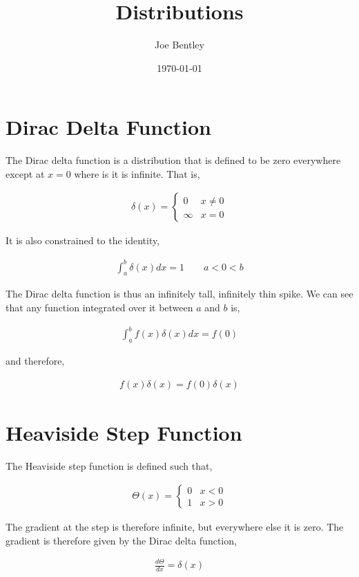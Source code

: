 \documentclass[11pt]{amsart}
\title{Distributions}
\author{Joe Bentley}
\date{\today}
\begin{document}
\maketitle

\newpage

\section{Dirac Delta Function}

The Dirac delta function is a distribution that is defined to be zero everywhere except at $x = 0$ where is it is infinite. That is,

\begin{align*}
  \delta(x)=
  \begin{cases}
    0 & x\neq0 \\
    \infty & x=0
  \end{cases}
\end{align*}

It is also constrained to the identity,

\begin{align*}
  \int_{a}^{b} \delta(x) dx = 1 \qquad a < 0 < b
\end{align*}

The Dirac delta function is thus an infinitely tall, infinitely thin spike. We can see that any function integrated over it between $a$ and $b$ is,

\begin{align*}
  \int_{a}^{b} f(x)\delta(x) dx = f(0)
\end{align*}

and therefore,

\begin{align*}
  f(x)\delta(x) = f(0)\delta(x)
\end{align*}

\section{Heaviside Step Function}

The Heaviside step function is defined such that,

\begin{align*}
  \Theta(x) =
  \begin{cases}
    0 & x < 0 \\
    1 & x > 0
  \end{cases}
\end{align*}

The gradient at the step is therefore infinite, but everywhere else it is zero. The gradient is therefore given by the Dirac delta function,

\begin{align*}
  \frac{d\Theta}{dx} = \delta(x)
\end{align*}
\end{document}
